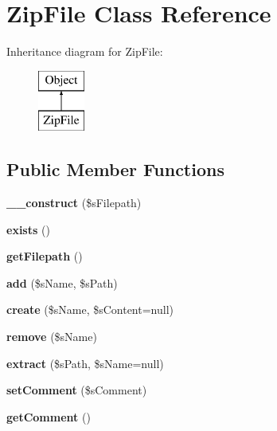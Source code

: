 \hypertarget{class_zip_file}{\section{Zip\-File Class Reference}
\label{class_zip_file}
}
Inheritance diagram for Zip\-File\-:\begin{figure}[H]
\begin{center}
\leavevmode
\includegraphics[height=2.000000cm]{class_zip_file}
\end{center}
\end{figure}
\subsection*{Public Member Functions}
\begin{DoxyCompactItemize}
\item 
\hypertarget{class_zip_file_a4a2220bc979bbaec487b598b9493eec7}{{\bfseries \-\_\-\-\_\-construct} (\$s\-Filepath)}\label{class_zip_file_a4a2220bc979bbaec487b598b9493eec7}

\item 
\hypertarget{class_zip_file_a3fdf219d5fd3866b3ac53d18d08850e5}{{\bfseries exists} ()}\label{class_zip_file_a3fdf219d5fd3866b3ac53d18d08850e5}

\item 
\hypertarget{class_zip_file_a9afaffe989df46a60b49c895569f35cc}{{\bfseries get\-Filepath} ()}\label{class_zip_file_a9afaffe989df46a60b49c895569f35cc}

\item 
\hypertarget{class_zip_file_a7e5d166120c089ae81c84cd554475820}{{\bfseries add} (\$s\-Name, \$s\-Path)}\label{class_zip_file_a7e5d166120c089ae81c84cd554475820}

\item 
\hypertarget{class_zip_file_ae1592b449614b615555fb9aeae0ca8fe}{{\bfseries create} (\$s\-Name, \$s\-Content=null)}\label{class_zip_file_ae1592b449614b615555fb9aeae0ca8fe}

\item 
\hypertarget{class_zip_file_a7955edfe78930ae2887679f71ff8ec88}{{\bfseries remove} (\$s\-Name)}\label{class_zip_file_a7955edfe78930ae2887679f71ff8ec88}

\item 
\hypertarget{class_zip_file_a15cc6fbc55bf965971f07d7ddce7de8b}{{\bfseries extract} (\$s\-Path, \$s\-Name=null)}\label{class_zip_file_a15cc6fbc55bf965971f07d7ddce7de8b}

\item 
\hypertarget{class_zip_file_ac3a25ea2892a7d98f8dde0b94b7a0b2a}{{\bfseries set\-Comment} (\$s\-Comment)}\label{class_zip_file_ac3a25ea2892a7d98f8dde0b94b7a0b2a}

\item 
\hypertarget{class_zip_file_a193b7eee7cf2f6877b63be1020725b66}{{\bfseries get\-Comment} ()}\label{class_zip_file_a193b7eee7cf2f6877b63be1020725b66}

\end{DoxyCompactItemize}
